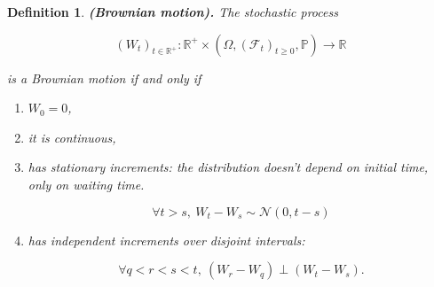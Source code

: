 \documentclass[oneside,titlepage,headinclude,12pt,a4paper,BCOR5mm,footinclude]{book}
\theoremstyle{defn}
\newtheorem{defn}{Definition}
\begin{document}
  \begin{defn} 
    \textbf{(Brownian motion).} The stochastic process 

    \[
      (W_t)_{t\in\mathbb{R}^+} : \mathbb{R}^+ \times (\Omega, (\mathcal{F}_t)_{t \geq 0}, \mathbb{P}) \to \mathbb{R}
    \]

    is a Brownian motion if and only if

    \begin{enumerate}[label=(\Roman*)]
      \item $W_0 = 0$,
      \item it is continuous,
      \item  has  stationary  increments:  the distribution  doesn't  depend  on
             initial time, only on waiting time.
        
        $$\forall t > s,\ W_t - W_s \sim \mathcal{N}(0,t-s)$$

      \item has independent increments over disjoint intervals: 
        
        $$\forall q < r < s < t,\ (W_r-W_q) \perp (W_t-W_s).$$
    \end{enumerate}
  \end{defn}

\end{document}
